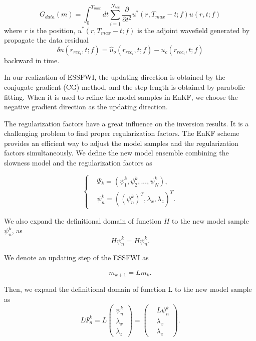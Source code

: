 \documentclass[mreferee]{gji}
\begin{document}
\begin{equation}
G_{data}(m)=\int_{0}^{T_{max}}dt\sum_{i=1}^{N_{rec}}\frac{\partial}{\partial t^2}u^*(r,T_{max}-t;f)u(r,t;f)
\end{equation}
where $r$ is the position, $u^*(r,T_{max}-t;f)$ is the adjoint wavefield generated by propagate the data residual
\begin{equation}
\delta u(r_{rec_i},t;f)=\hat u_o(r_{rec_i},t;f)-u_c(r_{rec_i},t;f)
\end{equation}
backward in time.

In our realization of ESSFWI, the updating direction is obtained by the conjugate gradient (CG) method, and the step length is obtained by parabolic fitting. When it is used to refine the model samples in EnKF, we choose the negative gradient direction as the updating direction.

The regularization factors have a great influence on the inversion results. It is a challenging problem to find proper regularization factors. The EnKF scheme provides an efficient way to adjust the model samples and the regularization factors simultaneously. We define the new model ensemble combining the slowness model and the regularization factors as

\begin{equation}
\left\{
\begin{aligned}
& \Psi_k=\left(\psi_1^k,\psi_2^k,...,\psi_N^k\right), \\
& \psi_n^k=\left((\psi_n^k)^T,\lambda_x,\lambda_z\right)^T.
\end{aligned}
\right.
\end{equation}

We also expand the definitional domain of function $H$ to the new model sample $\psi_n^k$, as
\begin{equation}
H\psi_n^{k}=H\psi_n^{k}.
\end{equation}

We denote an updating step of the ESSFWI as

\begin{equation}
m_{k+1}=Lm_k.
\end{equation}

Then, we expand the definitional domain of function L to the new model sample as
\begin{equation}
L\Psi_n^k=L
\left(
\begin{aligned}
\psi_n^k \\
\lambda_x \\
\lambda_z
\end{aligned}
\right)
=
\left(
\begin{aligned}
& L\psi_n^k \\
& \lambda_x \\
& \lambda_z
\end{aligned}
\right).
\end{equation}
\end{document}
